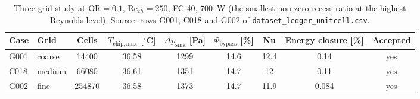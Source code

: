 \begin{table}[htbp]
\centering
\caption{Three-grid study at $\mathrm{OR} = 0.1$, $\mathrm{Re}_{ch} = 250$, FC-40, 700~W (the smallest non-zero recess ratio at the highest Reynolds level). Source: rows G001, C018 and G002 of \texttt{dataset\_ledger\_unitcell.csv}.}
\label{tab:grid}
\scriptsize
\begin{tabular}{@{}llccccccc@{}}
\hline
Case & Grid & Cells & $T_{\mathrm{chip,max}}$ [$^{\circ}$C] & $\Delta p_{\mathrm{sink}}$ [Pa] & $\Phi_{\mathrm{bypass}}$ [\%] & Nu & Energy closure [\%] & Accepted \\
\hline
G001 & coarse & 14400 & 36.58 & 1299 & 14.6 & 12.4 & 0.14 & yes \\
C018 & medium & 66080 & 36.61 & 1351 & 14.7 & 12 & 0.11 & yes \\
G002 & fine & 254870 & 36.58 & 1373 & 14.7 & 11.9 & 0.084 & yes \\
\hline
\end{tabular}
\end{table}

